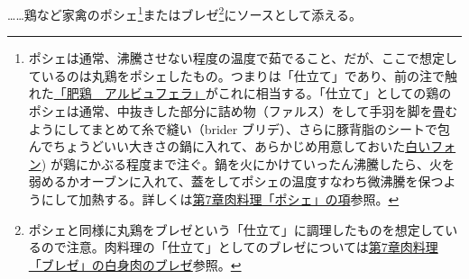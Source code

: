 \begin{recette}
\ldots{}\ldots{}鶏など家禽のポシェ\footnote{ポシェは通常、沸騰させない程度の温度で茹でること、だが、ここで想定しているのは丸鶏をポシェしたもの。つまりは「仕立て」であり、前の注で触れた\protect\hyperlink{poularde-albufera}{「肥鶏　アルビュフェラ」}がこれに相当する。「仕立て」としての鶏のポシェは通常、中抜きした部分に詰め物（ファルス）をして手羽を脚を畳むようにしてまとめて糸で縫い（brider
  ブリデ）、さらに豚背脂のシートで包んでちょうどいい大きさの鍋に入れて、あらかじめ用意しておいた\protect\hyperlink{fonds-blanc}{白いフォン})
  が鶏にかぶる程度まで注ぐ。鍋を火にかけていったん沸騰したら、火を弱めるかオーブンに入れて、蓋をしてポシェの温度すなわち微沸騰を保つようにして加熱する。詳しくは\protect\hyperlink{les-poches}{第7章肉料理「ポシェ」の項}参照。}またはブレゼ\footnote{ポシェと同様に丸鶏をブレゼという「仕立て」に調理したものを想定しているので注意。肉料理の「仕立て」としてのブレゼについては\protect\hyperlink{les-braisages-de-viandes-blanches}{第7章肉料理「ブレゼ」の白身肉のブレゼ}参照。}にソースとして添える。

\hypertarget{sauce-americaine}{%
}
\end{recette}
